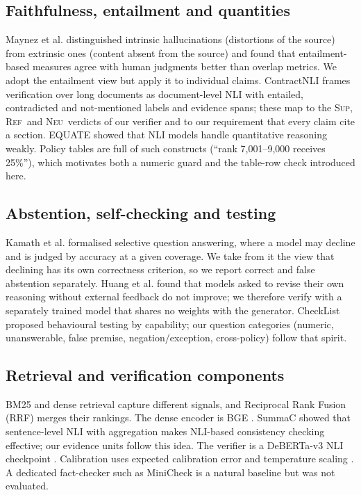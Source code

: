 \documentclass[conference]{IEEEtran}
\newcommand{\SUP}{\textsc{Sup}}
\newcommand{\REF}{\textsc{Ref}}
\newcommand{\NEU}{\textsc{Neu}}
\begin{document}
\subsection{Faithfulness, entailment and quantities}
Maynez et al. \cite{maynez2020faithfulness} distinguished intrinsic hallucinations (distortions of the
source) from extrinsic ones (content absent from the source) and found that entailment-based measures agree
with human judgments better than overlap metrics. We adopt the entailment view but apply it to individual
claims. ContractNLI \cite{koreeda2021contractnli} frames verification over long documents as
document-level NLI with entailed, contradicted and not-mentioned labels and evidence spans; these map to
the \SUP, \REF\ and \NEU\ verdicts of our verifier and to our requirement that every claim cite a section.
EQUATE \cite{ravichander2019equate} showed that NLI models handle quantitative reasoning weakly. Policy
tables are full of such constructs (``rank 7,001--9,000 receives 25\%''), which motivates both a numeric
guard and the table-row check introduced here.

\subsection{Abstention, self-checking and testing}
Kamath et al. \cite{kamath2020selective} formalised selective question answering, where a model may decline
and is judged by accuracy at a given coverage. We take from it the view that declining has its own
correctness criterion, so we report correct and false abstention separately. Huang et al.
\cite{huang2024selfcorrect} found that models asked to revise their own reasoning without external feedback
do not improve; we therefore verify with a separately trained model that shares no weights with the
generator. CheckList \cite{ribeiro2020checklist} proposed behavioural testing by capability; our question
categories (numeric, unanswerable, false premise, negation/exception, cross-policy) follow that spirit.

\subsection{Retrieval and verification components}
BM25 \cite{robertson2009bm25} and dense retrieval capture different signals, and Reciprocal Rank Fusion
(RRF) \cite{cormack2009rrf} merges their rankings. The dense encoder is BGE \cite{xiao2023cpack,bge}.
SummaC \cite{laban2022summac} showed that sentence-level NLI with aggregation makes NLI-based consistency
checking effective; our evidence units follow this idea. The verifier is a DeBERTa-v3
\cite{he2021debertav3} NLI checkpoint \cite{laurer}. Calibration uses expected calibration error and
temperature scaling \cite{guo2017calibration}. A dedicated fact-checker such as MiniCheck
\cite{tang2024minicheck} is a natural baseline but was not evaluated.
\end{document}
